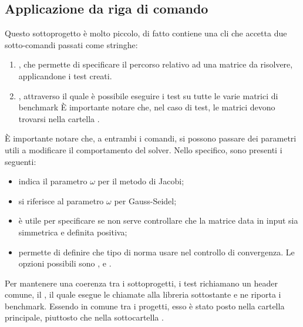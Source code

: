 \subsection{Applicazione da riga di comando}
Questo sottoprogetto è molto piccolo, di fatto contiene una cli che accetta due sotto-comandi passati come stringhe:

\begin{enumerate}
	\item {}, che permette di specificare il percorso relativo ad una matrice da risolvere, applicandone i test creati.
	\item {}, attraverso il quale è possibile eseguire i test su tutte le varie matrici di benchmark È importante notare che, nel caso di test, le matrici devono trovarsi nella cartella .
\end{enumerate}

È importante notare che, a entrambi i comandi, si possono passare dei parametri utili a modificare il comportamento del solver. Nello specifico, sono presenti i seguenti:

\begin{itemize}
	\item {} indica il parametro $\omega$ per il metodo di Jacobi;
	\item {} si riferisce al parametro $\omega$ per Gauss-Seidel;
	\item {} è utile per specificare se non serve controllare che la matrice data in input sia simmetrica e definita positiva;
	\item {} permette di definire che tipo di norma usare nel controllo di convergenza. Le opzioni possibili sono ,  e .
\end{itemize}

Per mantenere una coerenza tra i sottoprogetti, i test richiamano un header comune, il , il quale esegue le chiamate alla libreria sottostante e ne riporta i benchmark. Essendo in comune tra i progetti, esso è stato posto nella cartella principale, piuttosto che nella sottocartella .


